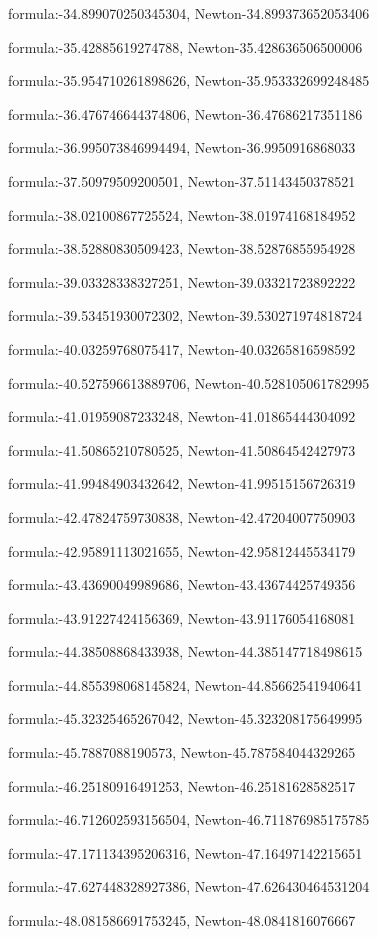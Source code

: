 \documentclass{article}
\begin{document}
formula:-34.899070250345304, Newton-34.899373652053406

formula:-35.42885619274788, Newton-35.428636506500006

formula:-35.954710261898626, Newton-35.953332699248485

formula:-36.476746644374806, Newton-36.47686217351186

formula:-36.995073846994494, Newton-36.9950916868033

formula:-37.50979509200501, Newton-37.51143450378521

formula:-38.02100867725524, Newton-38.01974168184952

formula:-38.52880830509423, Newton-38.52876855954928

formula:-39.03328338327251, Newton-39.03321723892222

formula:-39.53451930072302, Newton-39.530271974818724

formula:-40.03259768075417, Newton-40.03265816598592

formula:-40.527596613889706, Newton-40.528105061782995

formula:-41.01959087233248, Newton-41.01865444304092

formula:-41.50865210780525, Newton-41.50864542427973

formula:-41.99484903432642, Newton-41.99515156726319

formula:-42.47824759730838, Newton-42.47204007750903

formula:-42.95891113021655, Newton-42.95812445534179

formula:-43.43690049989686, Newton-43.43674425749356

formula:-43.91227424156369, Newton-43.91176054168081

formula:-44.38508868433938, Newton-44.385147718498615

formula:-44.855398068145824, Newton-44.85662541940641

formula:-45.32325465267042, Newton-45.323208175649995

formula:-45.7887088190573, Newton-45.787584044329265

formula:-46.25180916491253, Newton-46.25181628582517

formula:-46.712602593156504, Newton-46.711876985175785

formula:-47.171134395206316, Newton-47.16497142215651

formula:-47.627448328927386, Newton-47.626430464531204

formula:-48.081586691753245, Newton-48.0841816076667
\end{document}
